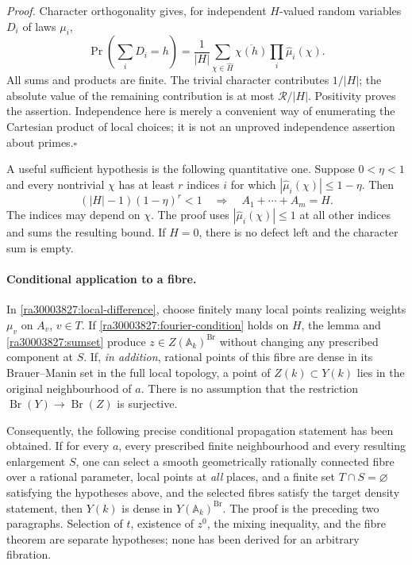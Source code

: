 \documentclass[11pt]{article}
\newcommand{\A}{\mathbb{A}}
\begin{document}
\emph{Proof.}
Character orthogonality gives, for independent $H$-valued random variables
$D_i$ of laws $\mu_i$,
\[
 \Pr\left(\sum_iD_i=h\right)
 =\frac1{|H|}\sum_{\chi\in\widehat H}
       \overline{\chi(h)}\prod_i\widehat\mu_i(\chi).
\]
All sums and products are finite.  The trivial character contributes $1/|H|$;
the absolute value of the remaining contribution is at most
$\mathcal R/|H|$.  Positivity proves the assertion.  Independence here is
merely a convenient way of enumerating the Cartesian product of local choices;
it is not an unproved independence assertion about primes.\hfill$\square$

A useful sufficient hypothesis is the following quantitative one.  Suppose
$0<\eta<1$ and every nontrivial $\chi$ has at least $r$ indices $i$ for which
$|\widehat\mu_i(\chi)|\le1-\eta$.  Then
\begin{equation}\label{ra30003827:quantitative}
 (|H|-1)(1-\eta)^r<1
 \quad\Longrightarrow\quad A_1+\cdots+A_m=H.
\end{equation}
The indices may depend on $\chi$.  The proof uses
$|\widehat\mu_i(\chi)|\le1$ at all other indices and sums the resulting bound.
If $H=0$, there is no defect left and the character sum is empty.

\paragraph{Conditional application to a fibre.}
In \eqref{ra30003827:local-difference}, choose finitely many local points realizing
weights $\mu_v$ on $A_v$, $v\in T$.  If
\eqref{ra30003827:fourier-condition} holds on $H$, the lemma and
\eqref{ra30003827:sumset} produce $z\in Z(\A_k)^{\operatorname{Br}}$ without changing
any prescribed component at $S$.  If, \emph{in addition}, rational points of
this fibre are dense in its Brauer--Manin set in the full local topology, a
point of $Z(k)\subset Y(k)$ lies in the original neighbourhood of $a$.
There is no assumption that the restriction $\operatorname{Br}(Y)\to
\operatorname{Br}(Z)$ is surjective.

Consequently, the following precise conditional propagation statement has
been obtained.  If for every $a$, every prescribed finite neighbourhood and
every resulting enlargement $S$, one can select a smooth geometrically
rationally connected fibre over a rational parameter, local points at \emph{all} places, and a finite set $T\cap S=\varnothing$
satisfying the hypotheses above, and the selected fibres satisfy the target
density statement, then $Y(k)$ is dense in $Y(\A_k)^{\operatorname{Br}}$.
The proof is the preceding two paragraphs.  Selection of $t$, existence of
$z^0$, the mixing inequality, and the fibre theorem are separate hypotheses;
none has been derived for an arbitrary fibration.
\end{document}
